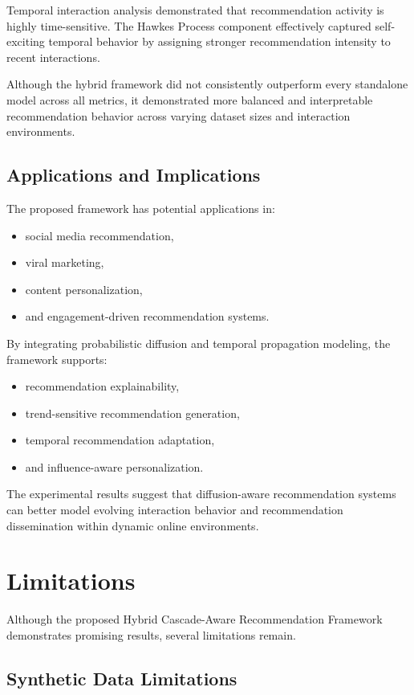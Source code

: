 \documentclass{article}
\begin{document}
Temporal interaction analysis demonstrated that recommendation activity is highly time-sensitive. The Hawkes Process component effectively captured self-exciting temporal behavior by assigning stronger recommendation intensity to recent interactions.

Although the hybrid framework did not consistently outperform every standalone model across all metrics, it demonstrated more balanced and interpretable recommendation behavior across varying dataset sizes and interaction environments.

\subsection{Applications and Implications}

The proposed framework has potential applications in:
\begin{itemize}
\item social media recommendation,
\item viral marketing,
\item content personalization,
\item and engagement-driven recommendation systems.
\end{itemize}

By integrating probabilistic diffusion and temporal propagation modeling, the framework supports:
\begin{itemize}
\item recommendation explainability,
\item trend-sensitive recommendation generation,
\item temporal recommendation adaptation,
\item and influence-aware personalization.
\end{itemize}

The experimental results suggest that diffusion-aware recommendation systems can better model evolving interaction behavior and recommendation dissemination within dynamic online environments.

\section{Limitations}

Although the proposed Hybrid Cascade-Aware Recommendation Framework demonstrates promising results, several limitations remain.

\subsection{Synthetic Data Limitations}
\end{document}
